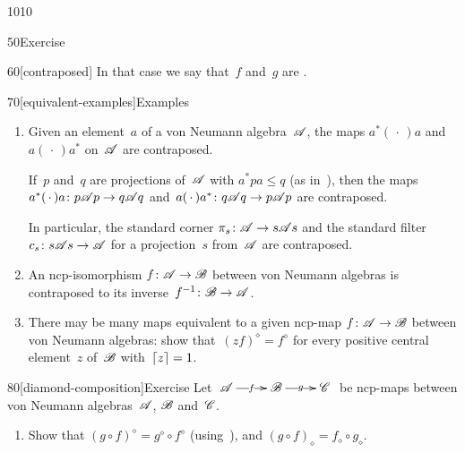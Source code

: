 \begin{parsec}{1010}
\begin{point}{50}{Exercise}
\begin{point}{60}[contraposed]
In that case we say that~$f$ and~$g$ are .%
\end{point}
\end{point}
\begin{point}{70}[equivalent-examples]{Examples}%
\begin{enumerate}
\item
Given an element~$a$ of a von Neumann algebra~$\mathscr{A}$,
the maps $a^*(\,\cdot\,)a$ and~$a(\,\cdot\,)a^*$
on~$\mathscr{A}$ are contraposed.

If~$p$ and~$q$ are projections of~$\mathscr{A}$
with $a^*pa\leq q$
(as in~),
then the maps
$a^*(\,\cdot\,)a \colon p\mathscr{A} p\to q\mathscr{A} q$
and~$a(\,\cdot\,)a^*\colon q\mathscr{A} q \to p\mathscr{A} p$
are contraposed.

In particular,
the standard corner $\pi_s\colon \mathscr{A}\to s \mathscr{A} s$
and the standard filter $c_s\colon s\mathscr{A} s\to \mathscr{A}$
for a projection~$s$ from~$\mathscr{A}$
are contraposed.
\item
An ncp-isomorphism $f\colon \mathscr{A}\to\mathscr{B}$
between von Neumann algebras
is contraposed to its inverse~$f^{-1}\colon \mathscr{B}\to\mathscr{A}$.
\item
There may be many maps equivalent to a given ncp-map $f\colon \mathscr{A}\to\mathscr{B}$
between von Neumann algebras:
show that~$(zf)^\diamond = f^\diamond$
for every positive central element~$z$ of~$\mathscr{B}$ with~$\left\lceil z\right\rceil=1$.
\end{enumerate}
\spacingfix%
\end{point}%
\begin{point}{80}[diamond-composition]{Exercise}%
Let $\xymatrix{
	\scrA\ar[r]|-{f}&
	\scrB\ar[r]|-{g}&
\scrC}$
be ncp-maps between von Neumann algebras~$\mathscr{A}$,
$\mathscr{B}$ and~$\mathscr{C}$.
\begin{enumerate}
\item
Show that $(g\circ f)^\diamond = g^\diamond\circ f^\diamond$
(using~),
and $(g\circ f)_\diamond = f_\diamond\circ g_\diamond$.


\end{enumerate}
\end{point}
\end{parsec}
